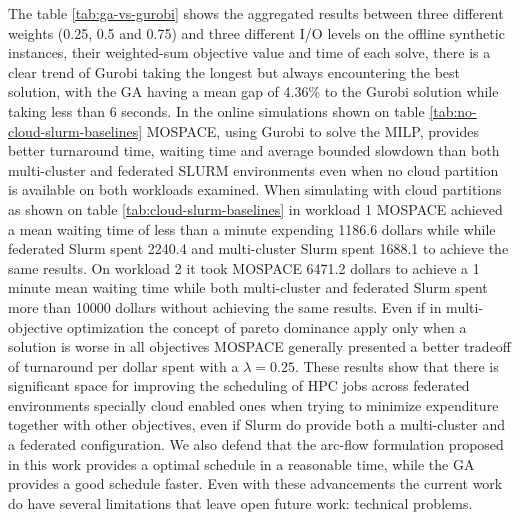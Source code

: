 \documentclass[conference]{IEEEtran}
\begin{document}
The table \ref{tab:ga-vs-gurobi} shows the aggregated results between three different weights (0.25, 0.5 and 0.75) and three different I/O levels on the offline synthetic instances, their weighted-sum objective value and time of each solve, there is a clear trend of Gurobi taking the longest but always encountering the best solution, with the GA having a mean gap of 4.36\% to the Gurobi solution while taking less than 6 seconds.
In the online simulations shown on table \ref{tab:no-cloud-slurm-baselines} MOSPACE, using Gurobi to solve the MILP, provides better turnaround time, waiting time and average bounded slowdown than both multi-cluster and federated SLURM environments even when no cloud partition is available on both workloads examined. When simulating with cloud partitions as shown on table \ref{tab:cloud-slurm-baselines} in workload 1 MOSPACE achieved a mean waiting time of less than a minute expending 1186.6 dollars while while federated Slurm spent 2240.4 and multi-cluster Slurm spent 1688.1 to achieve the same results. On workload 2 it took MOSPACE 6471.2 dollars to achieve a 1 minute mean waiting time while both multi-cluster and federated Slurm spent more than 10000 dollars without achieving the same results. Even if in multi-objective optimization the concept of pareto dominance apply only when a solution is worse in all objectives MOSPACE generally presented a better tradeoff of turnaround per dollar spent with a $\lambda=0.25$.
These results show that there is significant space for improving the scheduling of HPC jobs across federated environments  specially cloud enabled ones when trying to minimize expenditure together with other objectives, even if Slurm do provide both a multi-cluster and a federated configuration. We also defend that the arc-flow formulation proposed in this work provides a optimal schedule in a reasonable time, while the GA provides a good schedule faster. Even with these advancements the current work do have several limitations that leave open future work:  technical problems.
\end{document}
